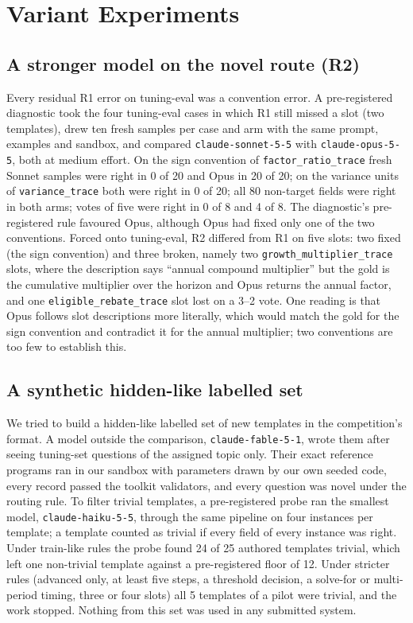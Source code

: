 \documentclass[conference]{IEEEtran}
\newcommand{\id}[1]{\texttt{#1}}
\begin{document}
\section{Variant Experiments}\label{sec:negative}

\subsection{A stronger model on the novel route (R2)}\label{sec:opus}
Every residual R1 error on tuning-eval was a convention error. A pre-registered diagnostic took the four tuning-eval cases in which R1 still missed a slot (two templates), drew ten fresh samples per case and arm with the same prompt, examples and sandbox, and compared \id{claude-sonnet-5-5} with \id{claude-opus-5-5}, both at medium effort. On the sign convention of \id{factor\_ratio\_trace} fresh Sonnet samples were right in 0 of 20 and Opus in 20 of 20; on the variance units of \id{variance\_trace} both were right in 0 of 20; all 80 non-target fields were right in both arms; votes of five were right in 0 of 8 and 4 of 8. The diagnostic's pre-registered rule favoured Opus, although Opus had fixed only one of the two conventions. Forced onto tuning-eval, R2 differed from R1 on five slots: two fixed (the sign convention) and three broken, namely two \id{growth\_multiplier\_trace} slots, where the description says ``annual compound multiplier'' but the gold is the cumulative multiplier over the horizon and Opus returns the annual factor, and one \id{eligible\_rebate\_trace} slot lost on a 3--2 vote. One reading is that Opus follows slot descriptions more literally, which would match the gold for the sign convention and contradict it for the annual multiplier; two conventions are too few to establish this.

\subsection{A synthetic hidden-like labelled set}
We tried to build a hidden-like labelled set of new templates in the competition's format. A model outside the comparison, \id{claude-fable-5-1}, wrote them after seeing tuning-set questions of the assigned topic only. Their exact reference programs ran in our sandbox with parameters drawn by our own seeded code, every record passed the toolkit validators, and every question was novel under the routing rule. To filter trivial templates, a pre-registered probe ran the smallest model, \id{claude-haiku-5-5}, through the same pipeline on four instances per template; a template counted as trivial if every field of every instance was right. Under train-like rules the probe found 24 of 25 authored templates trivial, which left one non-trivial template against a pre-registered floor of 12. Under stricter rules (advanced only, at least five steps, a threshold decision, a solve-for or multi-period timing, three or four slots) all 5 templates of a pilot were trivial, and the work stopped. Nothing from this set was used in any submitted system.
\end{document}
